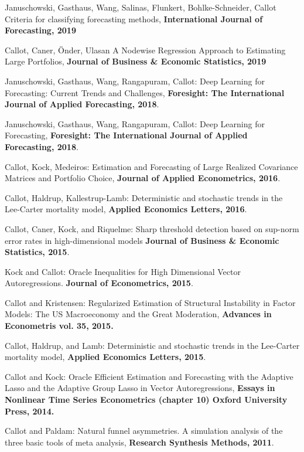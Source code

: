 \documentclass[10pt]{article}
\newenvironment{innerlist}[1][\enskip\textbullet]%
        {\begin{compactitem}[#1]}{\end{compactitem}}
\begin{document}
\begin{innerlist}
\item[Januschowski, Gasthaus, Wang, Salinas, Flunkert, Bohlke-Schneider, Callot] {Criteria for classifying forecasting methods}, \textbf{International Journal of Forecasting, 2019}
\item[Callot, Caner, Önder, Ulasan] {A Nodewise Regression Approach to Estimating Large Portfolios}, \textbf{Journal of Business \& Economic Statistics, 2019}
\item[Januschowski, Gasthaus, Wang, Rangapuram, Callot:] {Deep Learning for Forecasting: Current Trends and Challenges}, \textbf{Foresight: The International Journal of Applied Forecasting, 2018}.
\item[Januschowski, Gasthaus, Wang, Rangapuram, Callot:] {Deep Learning for Forecasting}, \textbf{Foresight: The International Journal of Applied Forecasting, 2018}.
\item[Callot, Kock, Medeiros:] {Estimation and Forecasting of Large Realized Covariance Matrices and Portfolio Choice}, \textbf{Journal of Applied Econometrics, 2016}.
\item[Callot, Haldrup, Kallestrup-Lamb:] {Deterministic and stochastic trends in the Lee-Carter mortality model}, \textbf{Applied Economics Letters, 2016}.
\item[Callot, Caner, Kock, and Riquelme:] Sharp threshold detection based on sup-norm error rates in high-dimensional models \textbf{Journal of Business \& Economic Statistics, 2015}.
\item[Kock and Callot:] {Oracle Inequalities for High Dimensional Vector Autoregressions}. \textbf{Journal of Econometrics, 2015}.
\item[Callot and Kristensen:] {Regularized Estimation of Structural Instability in Factor Models: The US Macroeconomy and the Great Moderation}, \textbf{Advances in Econometris vol. 35, 2015.}
\item[Callot, Haldrup, and Lamb:] {Deterministic and stochastic trends in the Lee-Carter mortality model}, \textbf{Applied Economics Letters, 2015}.
\item[Callot and Kock:] {Oracle Efficient Estimation and Forecasting with the Adaptive Lasso and the Adaptive Group Lasso in Vector Autoregressions}, \textbf{Essays in Nonlinear Time Series Econometrics (chapter 10) Oxford University Press, 2014.}
\item[Callot and Paldam:] {Natural funnel asymmetries. A simulation analysis of the three basic tools of meta analysis}, \textbf{Research Synthesis Methods, 2011}.
\end{innerlist}
\end{document}
